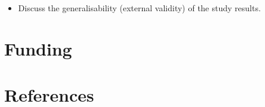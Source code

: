 \documentclass[
  letterpaper,
  DIV=11,
  numbers=noendperiod]{scrartcl}
\providecommand{\tightlist}{%
  \setlength{\itemsep}{0pt}\setlength{\parskip}{0pt}}\usepackage{longtable,booktabs,array}
\begin{document}
\begin{itemize}
\tightlist
\item
  Discuss the generalisability (external validity) of the study results.
\end{itemize}

\newpage

\section{Funding}\label{funding}

\newpage

\section*{References}\label{references}
\end{document}
